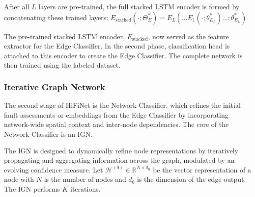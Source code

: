 After all \(L\) layers are pre-trained, the full stacked LSTM encoder is formed by concatenating these trained layers: \(E_\text{stacked}(\cdot; \Theta^*_{E}) = E_L(\ldots E_1(\cdot; \theta^*_{E_L}) \ldots;\theta^*_{E_L})\)

The pre-trained stacked LSTM encoder, \(E_\text{stacked}\), now served as the feature extractor for the Edge Classifier. In the second phase, classification head is attached to this encoder to create the Edge Classifier. The complete network is then trained using the labeled dataset.

\subsubsection{Iterative Graph Network}
The second stage of HiFiNet is the Network Classifier, which refines the initial fault assessments or embeddings from the Edge Classifier by incorporating network-wide spatial context and inter-node dependencies. The core of the Network Classifier is an IGN.

The IGN is designed to dynamically refine node representations by iteratively propagating and aggregating information across the graph, modulated by an evolving confidence measure. Let \(\mathcal{H}^{(0)} \in \mathbb{R}^{N \times d_0}\) be the vector representation of a node with \(N\) is the number of nodes and \(d_0\) is the dimension of the edge output. The IGN performs \(K\) iterations.

